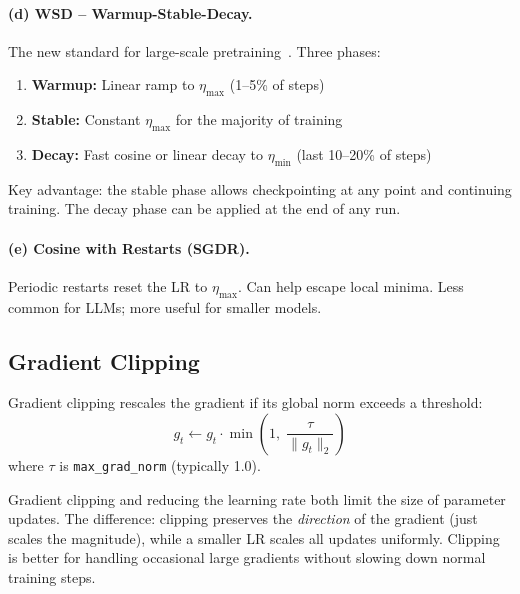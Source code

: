 \paragraph{(d) WSD -- Warmup-Stable-Decay.}
\label{d-wsd-warmup-stable-decay.}

The new standard for large-scale pretraining~\cite{hu2024minicpm, grattafiori2024llama3}. Three phases:

\begin{enumerate}
  \item \textbf{Warmup:} Linear ramp to $\eta_{\max}$ (1--5\% of steps)
  \item \textbf{Stable:} Constant $\eta_{\max}$ for the majority of training
  \item \textbf{Decay:} Fast cosine or linear decay to $\eta_{\min}$ (last 10--20\% of steps)
\end{enumerate}

Key advantage: the stable phase allows checkpointing at any point and continuing training. The decay phase can be applied at the end of any run.

\paragraph{(e) Cosine with Restarts (SGDR).}
\label{e-cosine-with-restarts-sgdr.}

Periodic restarts reset the LR to $\eta_{\max}$. Can help escape local minima. Less common for LLMs; more useful for smaller models.

\subsection{Gradient Clipping}
\label{gradient-clipping}

\begin{keybox}
Gradient clipping rescales the gradient if its global norm exceeds a threshold: 
\[
g_t \leftarrow g_t \cdot \min\!\left(1,\; \frac{\tau}{\|g_t\|_2}\right)
\]
 where $\tau$ is \texttt{max\_grad\_norm} (typically 1.0).
\end{keybox}

\begin{intuitionbox}
Gradient clipping and reducing the learning rate both limit the size of parameter updates. The difference: clipping preserves the \emph{direction} of the gradient (just scales the magnitude), while a smaller LR scales all updates uniformly. Clipping is better for handling occasional large gradients without slowing down normal training steps.
\end{intuitionbox}

